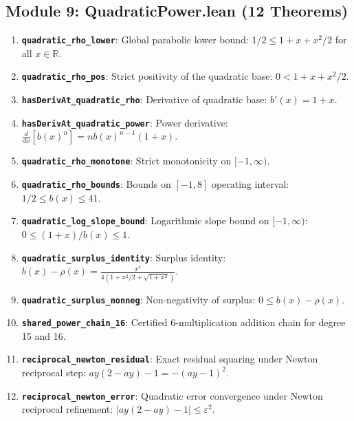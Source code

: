 \documentclass[11pt,a4paper]{article}
\theoremstyle{definition}
\begin{document}
\subsection{Module 9: QuadraticPower.lean (12 Theorems)}
\begin{enumerate}
    \item \textbf{\texttt{quadratic\_rho\_lower}}: Global parabolic lower bound: $1/2 \le 1 + x + x^2/2$ for all $x \in \mathbb{R}$.
    \item \textbf{\texttt{quadratic\_rho\_pos}}: Strict positivity of the quadratic base: $0 < 1 + x + x^2/2$.
    \item \textbf{\texttt{hasDerivAt\_quadratic\_rho}}: Derivative of quadratic base: $b'(x) = 1 + x$.
    \item \textbf{\texttt{hasDerivAt\_quadratic\_power}}: Power derivative: $\frac{d}{dx}[b(x)^n] = n b(x)^{n-1}(1 + x)$.
    \item \textbf{\texttt{quadratic\_rho\_monotone}}: Strict monotonicity on $[-1, \infty)$.
    \item \textbf{\texttt{quadratic\_rho\_bounds}}: Bounds on $[-1, 8]$ operating interval: $1/2 \le b(x) \le 41$.
    \item \textbf{\texttt{quadratic\_log\_slope\_bound}}: Logarithmic slope bound on $[-1, \infty)$: $0 \le (1+x)/b(x) \le 1$.
    \item \textbf{\texttt{quadratic\_surplus\_identity}}: Surplus identity: $b(x) - \rho(x) = \frac{x^4}{4(1 + x^2/2 + \sqrt{1+x^2})}$.
    \item \textbf{\texttt{quadratic\_surplus\_nonneg}}: Non-negativity of surplus: $0 \le b(x) - \rho(x)$.
    \item \textbf{\texttt{shared\_power\_chain\_16}}: Certified 6-multiplication addition chain for degree 15 and 16.
    \item \textbf{\texttt{reciprocal\_newton\_residual}}: Exact residual squaring under Newton reciprocal step: $a y (2 - a y) - 1 = -(a y - 1)^2$.
    \item \textbf{\texttt{reciprocal\_newton\_error}}: Quadratic error convergence under Newton reciprocal refinement: $|a y (2 - a y) - 1| \le \varepsilon^2$.
\end{enumerate}
\end{document}
